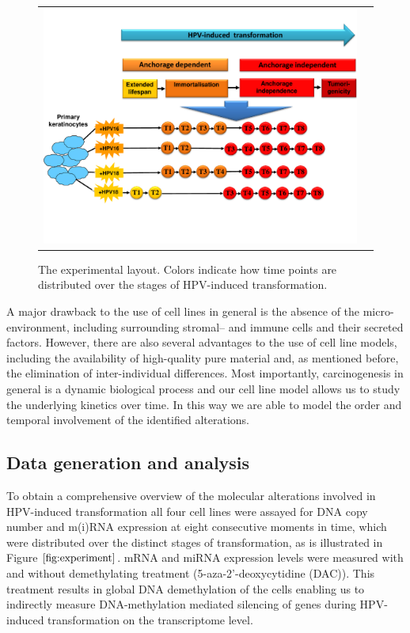 \begin{figure}[h!]
\centering
\begin{tabular}{cc}
\includegraphics[scale=0.45]{experiment2.pdf}\\
\end{tabular}
\caption{The experimental layout. Colors indicate how time points are distributed over the stages of HPV-induced transformation.}
\label{fig:experiment}
\end{figure}

A major drawback to the use of cell lines in general is the absence of the micro-environment, including surrounding stromal– and immune cells and their secreted factors. However, there are also several advantages to the use of cell line models, including the availability of high-quality pure material and, as mentioned before, the elimination of inter-individual differences. Most importantly,  carcinogenesis in general is a dynamic biological process and our cell line model allows us to study the underlying kinetics over time.  In this way  we are able to model the order and temporal involvement of the identified alterations. 

\subsection{Data generation and analysis}

To obtain a comprehensive overview of the molecular alterations involved in HPV-induced transformation all four cell lines were assayed for DNA copy number and m(i)RNA expression at eight consecutive moments in time, which were distributed over the distinct stages of transformation, as is illustrated in Figure $\ref{fig:experiment}$. mRNA and miRNA expression levels were measured with and without demethylating treatment (5-aza-2'-deoxycytidine (DAC)). This treatment results in global DNA demethylation of the cells enabling us to indirectly measure DNA-methylation mediated silencing of genes during HPV-induced transformation on the transcriptome level.

